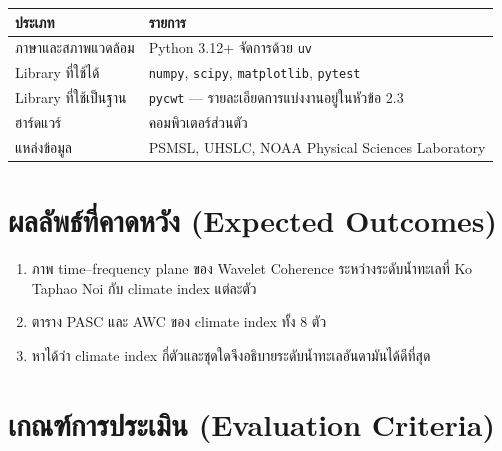 \documentclass[a4paper,12pt]{article}
\begin{document}
\begin{center}
\begin{tabular}{@{}L{4.6cm}L{9.8cm}@{}}
\toprule
\textbf{ประเภท} & \textbf{รายการ} \\
\midrule
ภาษาและสภาพแวดล้อม     & Python 3.12+ จัดการด้วย \texttt{uv} \\
Library ที่ใช้ได้        & \texttt{numpy}, \texttt{scipy}, \texttt{matplotlib}, \texttt{pytest} \\
Library ที่ใช้เป็นฐาน    & \texttt{pycwt} --- รายละเอียดการแบ่งงานอยู่ในหัวข้อ 2.3 \\
ฮาร์ดแวร์               & คอมพิวเตอร์ส่วนตัว \\
แหล่งข้อมูล             & PSMSL, UHSLC, NOAA Physical Sciences Laboratory \\
\bottomrule
\end{tabular}
\end{center}

\clearpage
\section{ผลลัพธ์ที่คาดหวัง (Expected Outcomes)}

\begin{enumerate}
  \item ภาพ time--frequency plane ของ Wavelet Coherence ระหว่างระดับน้ำทะเลที่ Ko Taphao Noi
        กับ climate index แต่ละตัว
  \item ตาราง PASC และ AWC ของ climate index ทั้ง 8 ตัว 
  \item หาได้ว่า climate index กี่ตัวและชุดใดจึงอธิบายระดับน้ำทะเลอันดามันได้ดีที่สุด
\end{enumerate}

\section{เกณฑ์การประเมิน (Evaluation Criteria)}
\end{document}
